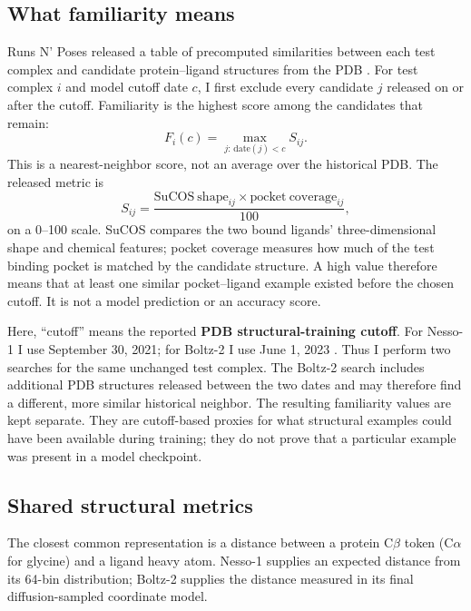 \documentclass[11pt]{article}
\begin{document}
\subsection{What familiarity means}

Runs N' Poses released a table of precomputed similarities between each test
complex and candidate protein--ligand structures from the PDB
\citep{skrinjar2025runsnposes}. For test complex $i$ and model cutoff date $c$,
I first exclude every candidate $j$ released on or after the cutoff. Familiarity
is the highest score among the candidates that remain:
\[
 F_i(c)=\max_{j:\,\mathrm{date}(j)<c}
 S_{ij}.
\]
This is a nearest-neighbor score, not an average over the historical PDB. The
released metric is
\[
 S_{ij}=\frac{\mathrm{SuCOS\ shape}_{ij}\times
 \mathrm{pocket\ coverage}_{ij}}{100},
\]
on a 0--100 scale. SuCOS compares the two bound ligands' three-dimensional
shape and chemical features; pocket coverage measures how much of the test
binding pocket is matched by the candidate structure. A high value therefore
means that at least one similar pocket--ligand example existed before the
chosen cutoff. It is not a model prediction or an accuracy score.

Here, ``cutoff'' means the reported \textbf{PDB structural-training cutoff}.
For Nesso-1 I use September 30, 2021; for Boltz-2 I use June 1, 2023
\citep{shenoy2026nesso1,passaro2025boltz2}. Thus I perform two searches for the
same unchanged test complex. The Boltz-2 search includes additional PDB
structures released between the two dates and may therefore find a different,
more similar historical neighbor. The resulting familiarity values are kept
separate. They are cutoff-based proxies for what structural examples could
have been available during training; they do not prove that a particular
example was present in a model checkpoint.

\subsection{Shared structural metrics}

The closest common representation is a distance between a protein C$\beta$
token (C$\alpha$ for glycine) and a ligand heavy atom. Nesso-1 supplies an
expected distance from its 64-bin distribution; Boltz-2 supplies the distance
measured in its final diffusion-sampled coordinate model.
\end{document}
